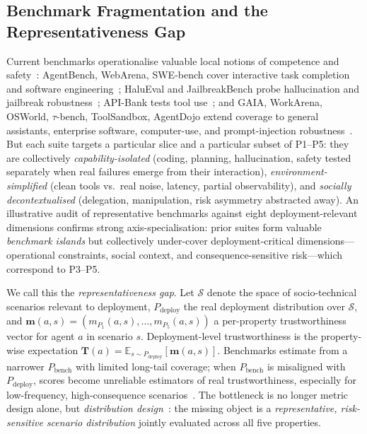 \subsection{Benchmark Fragmentation and the Representativeness Gap}
\label{subsec:gap}

Current benchmarks operationalise valuable local notions of competence and safety~\cite{mohammadi2025agenteval}: AgentBench, WebArena, SWE-bench cover interactive task completion and software engineering~\cite{liu2023agentbench,zhou2023webarena,jimenez2023swebench}; HaluEval and JailbreakBench probe hallucination and jailbreak robustness~\cite{li2023halueval,chao2024jailbreakbench}; API-Bank tests tool use~\cite{li2023apibank}; and GAIA, WorkArena, OSWorld, $\tau$-bench, ToolSandbox, AgentDojo extend coverage to general assistants, enterprise software, computer-use, and prompt-injection robustness~\cite{mialon2023gaia,drouin2024workarena,xie2024osworld,yao2024taubench,lu2024toolsandbox,debenedetti2024agentdojo}. But each suite targets a particular slice and a particular subset of P1--P5: they are collectively \emph{capability-isolated} (coding, planning, hallucination, safety tested separately when real failures emerge from their interaction), \emph{environment-simplified} (clean tools vs.\ real noise, latency, partial observability), and \emph{socially decontextualised} (delegation, manipulation, risk asymmetry abstracted away). An illustrative audit of representative benchmarks against eight deployment-relevant dimensions confirms strong axis-specialisation: prior suites form valuable \emph{benchmark islands} but collectively under-cover deployment-critical dimensions---operational constraints, social context, and consequence-sensitive risk---which correspond to P3--P5.

We call this the \emph{representativeness gap}. Let $\mathcal{S}$ denote the space of socio-technical scenarios relevant to deployment, $P_{\mathrm{deploy}}$ the real deployment distribution over $\mathcal{S}$, and $\mathbf{m}(a,s)=(m_{P_1}(a,s),\dots,m_{P_5}(a,s))$ a per-property trustworthiness vector for agent $a$ in scenario $s$. Deployment-level trustworthiness is the property-wise expectation $\mathbf{T}(a) = \mathbb{E}_{s \sim P_{\mathrm{deploy}}}[\mathbf{m}(a,s)]$. Benchmarks estimate from a narrower $P_{\mathrm{bench}}$ with limited long-tail coverage; when $P_{\mathrm{bench}}$ is misaligned with $P_{\mathrm{deploy}}$, scores become unreliable estimators of real trustworthiness, especially for low-frequency, high-consequence scenarios~\cite{eriksson2025trustbenchmarks}. The bottleneck is no longer metric design alone, but \emph{distribution design}~\cite{liang2023helm,kiela2021dynabench,shirali2022dynamicbench,koh2021wilds}: the missing object is a \emph{representative, risk-sensitive scenario distribution} jointly evaluated across all five properties.

